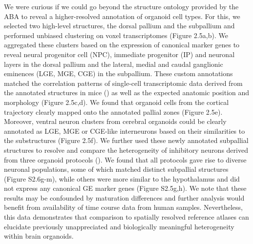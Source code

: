 We were curious if we could go beyond the structure ontology provided by the ABA to reveal a higher-resolved annotation of organoid cell types. For this, we selected two high-level structures, the dorsal pallium and the subpallium and performed unbiased clustering on voxel transcriptomes (Figure 2.5a,b). We aggregated these clusters based on the expression of canonical marker genes to reveal neural progenitor cell (NPC), immediate progenitor (IP) and neuronal layers in the dorsal pallium and the lateral, medial and caudal ganglionic eminences (LGE, MGE, CGE) in the subpallium. These custom annotations matched the correlation patterns of single-cell transcriptomic data derived from the annotated structures in mice (\cite{loo_single-cell_2019,mayer_developmental_2018}) as well as the expected anatomic position and morphology (Figure 2.5c,d). We found that organoid cells from the cortical trajectory clearly mapped onto the annotated pallial zones (Figure 2.5e). Moreover, ventral neuron clusters from cerebral organoids could be clearly annotated as LGE, MGE or CGE-like interneurons based on their similarities to the substructures (Figure 2.5f). We further used these newly annotated subpallial structures to resolve and compare the heterogeneity of inhibitory neurons derived from three organoid protocols (\cite{birey_assembly_2017,kanton_organoid_2019,xiang_hesc-derived_2019}). We found that all protocols gave rise to diverse neuronal populations, some of which matched distinct subpallial structures (Figure S2.6g-m), while others were more similar to the hypothalamus and did not express any canonical GE marker genes (Figure S2.5g,h). We note that these results may be confounded by maturation differences and further analysis would benefit from availability of time course data from human samples. Nevertheless, this data demonstrates that comparison to spatially resolved reference atlases can elucidate previously unappreciated and biologically meaningful heterogeneity within brain organoids.


